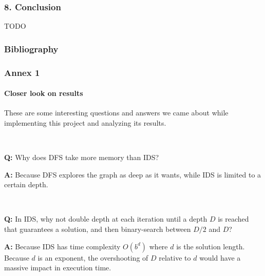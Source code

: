 \documentclass{beamer}
\begin{document}
\begin{frame}
\frametitle{8. Conclusion}

TODO

\end{frame}

\begin{frame}
  \frametitle{Bibliography}
  
  
  
\end{frame}

\begin{frame}
  \frametitle{Annex 1}
  \framesubtitle{Closer look on results}

  These are some interesting questions and answers we came about while implementing this project and analyzing its results.

  ~
  
  \textbf{Q:} Why does DFS take more memory than IDS?
  
  \textbf{A:} Because DFS explores the graph as deep as it wants, while IDS is limited to a certain depth.
  
  ~

  \textbf{Q:} In IDS, why not double depth at each iteration until a depth $D$ is reached that guarantees a solution, and then binary-search between $D/2$ and $D$?

  \textbf{A:} Because IDS has time complexity $O(b^d)$ where $d$ is the solution length. Because $d$ is an exponent, the overshooting of $D$ relative to $d$ would have a massive impact in execution time.

\end{frame}
\end{document}
